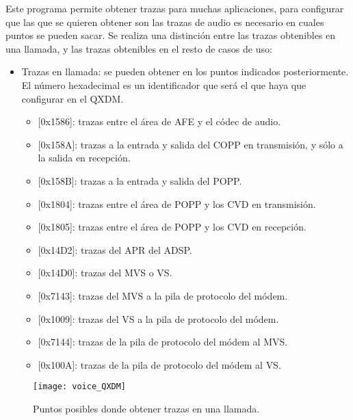 Este programa permite obtener trazas para muchas aplicaciones, para configurar que las que se quieren obtener son las trazas de audio es necesario en cuales puntos se pueden sacar. Se realiza una distinción entre las trazas obtenibles en una llamada, y las trazas obtenibles en el resto de casos de uso:

\begin{itemize}
		\item{Trazas en llamada: se pueden obtener en los puntos indicados posteriormente. El número hexadecimal es un identificador que será el que haya que configurar en el \gls{QXDM}.}
		\begin{itemize}
			\item{[0x1586]: trazas entre el área de \gls{AFE} y el códec de audio.}
			\item{[0x158A]: trazas a la entrada y salida del \gls{COPP} en transmisión, y sólo a la salida en recepción.}
			\item{[0x158B]: trazas a la entrada y salida del \gls{POPP}.}
			\item{[0x1804]: trazas entre el área de \gls{POPP} y los \gls{CVD} en transmisión.}
			\item{[0x1805]: trazas entre el área de \gls{POPP} y los \gls{CVD} en recepción.}
			\item{[0x14D2]: trazas del \gls{APR} del \gls{ADSP}.}
			\item{[0x14D0]: trazas del \gls{MVS} o \gls{VS}.}
			\item{[0x7143]: trazas del \gls{MVS} a la pila de protocolo del módem.}
			\item{[0x1009]: trazas del \gls{VS} a la pila de protocolo del módem.}
			\item{[0x7144]: trazas de la pila de protocolo del módem al \gls{MVS}.}
			\item{[0x100A]: trazas de la pila de protocolo del módem al \gls{VS}.}
		\end{itemize}
\end{itemize}

\begin{figure}[H]
		\centering
		\texttt{[image: voice\_QXDM]}
		\caption{Puntos posibles donde obtener trazas en una llamada.} 
		\label{fig:voice_qxdm}
\end{figure}

